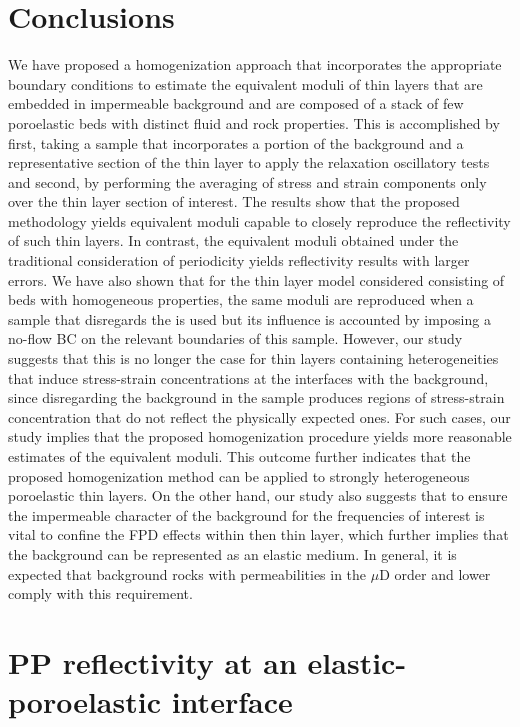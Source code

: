 \documentclass[draft]{agujournal2019}
\begin{document}
\section{Conclusions}
We have proposed a homogenization approach that incorporates the appropriate boundary conditions to estimate the equivalent moduli of thin layers that are embedded in impermeable background and are composed of a stack of few poroelastic beds with distinct fluid and rock properties.
This is accomplished by first, taking a sample that incorporates a portion of the background and a representative section of the thin layer to apply the relaxation oscillatory tests and second, by performing the averaging of stress and strain components only over the thin layer section of interest.
The results show that the proposed methodology yields equivalent moduli capable to closely reproduce the reflectivity of such thin layers. In contrast, the equivalent moduli obtained under the traditional consideration of periodicity yields reflectivity results with larger errors. We  have also shown that for the thin layer model considered consisting of beds with homogeneous properties, the same moduli are reproduced when a sample that disregards the is used but its influence is accounted by imposing a no-flow BC on the relevant boundaries of this sample. However, our study suggests that this is no longer the case for thin layers containing heterogeneities that induce stress-strain concentrations at the interfaces with the background, since disregarding the background in the sample produces regions of stress-strain concentration that do not reflect the physically expected ones. For such cases, our study implies that the proposed homogenization procedure yields more reasonable estimates of the equivalent moduli. This outcome further indicates that the proposed homogenization method can be applied to strongly heterogeneous poroelastic thin layers.
On the other hand, our study also suggests that to ensure the impermeable character
of the background for the frequencies of interest is vital to confine the FPD effects within then thin layer, which further implies that the background can be represented as an elastic medium. In general, it is expected that background rocks with permeabilities in the $\mu$D order and lower comply with this requirement.



\appendix
\section{PP reflectivity  at an elastic-poroelastic interface}
\end{document}

